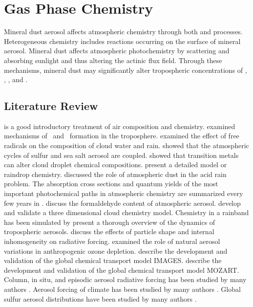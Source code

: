 \documentclass[12pt,twoside]{book}
\newcounter{reaction} %
\begin{document}
\chapter{Gas Phase Chemistry}\label{sxn:chm_gas}

Mineral dust aerosol affects atmospheric chemistry through both
 and  processes.
Heterogeneous chemistry includes reactions occurring on the surface of
mineral aerosol.
Mineral dust affects atmospheric photochemistry by scattering and
absorbing sunlight and thus altering the actinic flux field.
Through these mechanisms, mineral dust may significantly alter
tropospheric concentrations of \SIV, \NOy, \Ot, and \OH.

\section[Literature Review]{Literature Review}\label{sxn:ltr_rvw_chm}
\cite{Bri962} is a good introductory treatment of air composition and
chemistry. 
\cite{CLG85} examined mechanisms of \HNOt\ and \HdOd\ formation in the
troposphere. 
\cite{ChD82} examined the effect of free radicals on the composition
of cloud water and rain.
\cite{ChS92} showed that the atmospheric cycles of sulfur and sea salt
aerosol are coupled.
\cite{GMW86} showed that transition metals can alter cloud droplet
chemical compositions.
\cite{GrG88} present a detailed model or raindrop chemistry.
\cite{HeL96} discussed the role of atmospheric dust in the acid rain
problem. 
The absorption cross sections and quantum yields of the most important
photochemical paths in atmospheric chemistry are summarized every few
years in \cite{JPL97}.
\cite{KlW96} discuss the formaldehyde content of atmospheric aerosol.
\cite{LLL96} develop and validate a three dimensional cloud chemistry
model. 
Chemistry in a rainband has been simulated by \cite{BHH92,Bar94,LYM90}
\cite{PWS95} present a thorough overview of the dynamics of
tropospheric aerosols.
\cite{PiL98} discuss the effects of particle shape and internal
inhomogeneity on radiative forcing.
\cite{SPG96} examined the role of natural aerosol variations in
anthropogenic ozone depletion.
\cite{MuB95} describe the development and validation of the global
chemical transport model IMAGES.
\cite{BHW98} describe the development and validation of the global
chemical transport model MOZART.
Column, in situ, and episodic aerosol radiative forcing has been
studied by many authors 
\cite[e.g.,][]{JLR98,LiS982,PTM98,SKR98}.
Aerosol forcing of climate has been studied by many authors
\cite[e.g.,][]{KiB93,VRN98,TLF96,MiT98a,MiT98b,SAK98,AKS98,Bou95,ChW94,DKS91,HaR98,LiS981,SFC97,THC97,WKB98}.
Global sulfur aerosol distributions have been studied by many authors
\cite[e.g.,][]{RBK00,BRK00,DKS91,THC97}.
\end{document}
